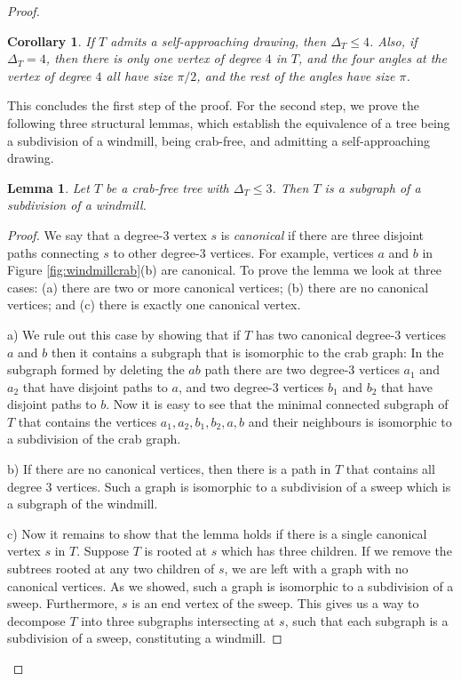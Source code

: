 \documentclass[11pt]{article}
\newtheorem{lemma}[theorem]{Lemma}
\newtheorem{corollary}[theorem]{Corollary}
\newcommand{\changeAL}[1]{{#1}}
\newcommand{\changeS}[1]{{#1}}
\begin{document}
\begin{proof}
\begin{corollary}
If $T$ admits a self-approaching drawing, then $\Delta_T \leq 4$. Also, if $\Delta_T = 4$, then there is only one vertex of degree $4$ in $T$, and the four angles at the vertex of degree $4$ all have size $\pi/2$, and the rest of the angles have size $\pi$.
\end{corollary}
This concludes the first step of the proof.  For the second step, we prove the following three structural lemmas, which establish the equivalence of a tree being a subdivision of a windmill, being crab-free, and admitting a self-approaching drawing.

\begin{lemma}
\label{onethreelemma}
Let $T$ be a crab-free tree with $\Delta_T \leq 3$. Then $T$ is \changeS{a subgraph of} a subdivision of a windmill.
\end{lemma}
\begin{proof}
\changeS{We say that a degree-3 vertex $s$ is \emph{canonical} if there are three disjoint paths connecting $s$ to other degree-3 vertices. For example, vertices $a$ and $b$ in Figure \ref{fig:windmillcrab}(b) are canonical. To prove the lemma we look at three cases: (a) there are two or more canonical vertices; (b) there are no canonical vertices; and (c) there is exactly one canonical vertex.

\changeAL{
a) We rule out this case by showing that if $T$ has two canonical degree-3 vertices $a$ and $b$ then it contains a subgraph that is isomorphic to the crab graph:
In the subgraph formed by deleting the $ab$ path there are
two degree-3 vertices $a_1$ and $a_2$ that have disjoint paths to $a$, and two degree-3 vertices $b_1$ and $b_2$ that have disjoint
paths to $b$.
Now it is easy to see that the minimal connected subgraph of $T$ that contains the vertices $a_1,a_2,b_1,b_2,a,b$ and their neighbours is isomorphic to a subdivision of the crab graph.
}

b) If there are no canonical vertices, then there is a path in $T$ that contains all degree $3$ vertices. Such a graph is isomorphic to a subdivision of a sweep which is a subgraph of the windmill.

c) Now it remains to show that the lemma holds if there is a single canonical vertex $s$ in $T$. Suppose $T$ is rooted at $s$ which has three children. If we remove the subtrees rooted at any two children of $s$, we are left with a graph with no canonical vertices. As we showed, such a graph is isomorphic to a subdivision of a sweep. Furthermore, $s$ is an end vertex of the sweep.  This gives us a way to decompose $T$ into three subgraphs intersecting at $s$, such that each subgraph is a subdivision of a sweep, constituting a windmill.}
\end{proof}


\end{proof}
\end{document}
